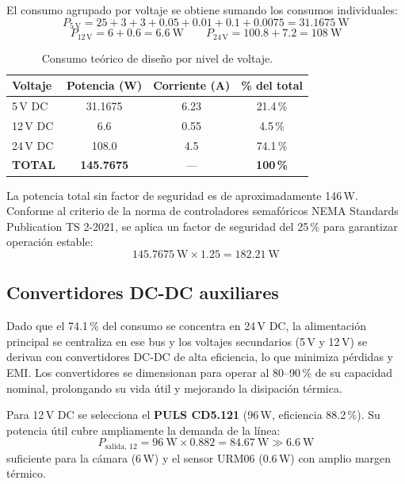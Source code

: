 El consumo agrupado por voltaje se obtiene sumando los consumos individuales:
\[ P_{5\,\mathrm{V}} = 25 + 3 + 3 + 0.05 + 0.01 + 0.1 + 0.0075 = 31.1675\ \mathrm{W} \]
\[ P_{12\,\mathrm{V}} = 6 + 0.6 = 6.6\ \mathrm{W} \qquad P_{24\,\mathrm{V}} = 100.8 + 7.2 = 108\ \mathrm{W} \]

\begin{table}[H]
  \centering
  \caption{Consumo teórico de diseño por nivel de voltaje.}
  \label{tab:consumo-voltaje}
  \footnotesize
  \begin{tabular}{@{}lccc@{}}
    \toprule
    \textbf{Voltaje} & \textbf{Potencia (W)} & \textbf{Corriente (A)} & \textbf{\% del total}\\
    \midrule
    5\,V DC & 31.1675 & 6.23 & 21.4\,\%\\
    12\,V DC & 6.6 & 0.55 & 4.5\,\%\\
    24\,V DC & 108.0 & 4.5 & 74.1\,\%\\
    \textbf{TOTAL} & \textbf{145.7675} & --- & \textbf{100\,\%}\\
    \bottomrule
  \end{tabular}
\end{table}

La potencia total sin factor de seguridad es de aproximadamente 146\,W. Conforme al criterio de la norma de
controladores semafóricos NEMA Standards Publication TS 2-2021, se aplica un factor de seguridad del 25\,\%
para garantizar operación estable:
\[ 145.7675\ \mathrm{W} \times 1.25 = 182.21\ \mathrm{W} \]

\subsection{Convertidores DC-DC auxiliares}

Dado que el 74.1\,\% del consumo se concentra en 24\,V DC, la alimentación principal se centraliza en ese
bus y los voltajes secundarios (5\,V y 12\,V) se derivan con convertidores DC-DC de alta eficiencia, lo que
minimiza pérdidas y EMI. Los convertidores se dimensionan para operar al 80--90\,\% de su capacidad nominal,
prolongando su vida útil y mejorando la disipación térmica.

Para 12\,V DC se selecciona el \textbf{PULS CD5.121} (96\,W, eficiencia 88.2\,\%). Su potencia útil cubre
ampliamente la demanda de la línea:
\[ P_{\mathrm{salida},\,12} = 96\ \mathrm{W} \times 0.882 = 84.67\ \mathrm{W} \gg 6.6\ \mathrm{W} \]
suficiente para la cámara (6\,W) y el sensor URM06 (0.6\,W) con amplio margen térmico.

